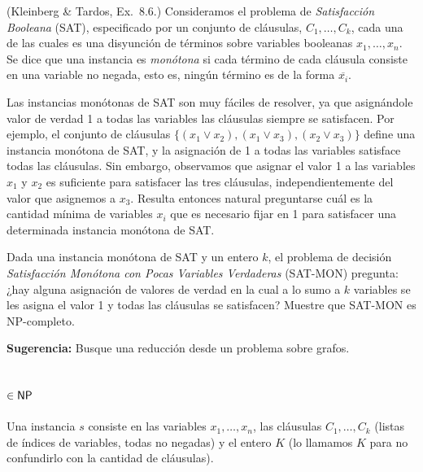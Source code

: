 \begin{enunciado}
(Kleinberg \& Tardos, Ex.~8.6.) Consideramos el problema de \emph{Satisfacción Booleana} (SAT),
especificado por un conjunto de cláusulas, $C_1,\dots,C_k$, cada una de las cuales es una disyunción de
términos sobre variables booleanas $x_1,\dots,x_n$. Se dice que una instancia es \emph{monótona} si cada
término de cada cláusula consiste en una variable no negada, esto es, ningún término es de la forma
$\overline{x_i}$.

Las instancias monótonas de SAT son muy fáciles de resolver, ya que asignándole valor de verdad 1 a todas
las variables las cláusulas siempre se satisfacen. Por ejemplo, el conjunto de cláusulas
$\{(x_1\vee x_2),(x_1\vee x_3),(x_2\vee x_3)\}$ define una instancia monótona de SAT, y la asignación de 1 a
todas las variables satisface todas las cláusulas. Sin embargo, observamos que asignar el valor 1 a las
variables $x_1$ y $x_2$ es suficiente para satisfacer las tres cláusulas, independientemente del valor que
asignemos a $x_3$. Resulta entonces natural preguntarse cuál es la cantidad mínima de variables $x_i$ que es
necesario fijar en 1 para satisfacer una determinada instancia monótona de SAT.

Dada una instancia monótona de SAT y un entero $k$, el problema de decisión \emph{Satisfacción Monótona
con Pocas Variables Verdaderas} (SAT-MON) pregunta: ¿hay alguna asignación de valores de verdad en la cual a
lo sumo a $k$ variables se les asigna el valor 1 y todas las cláusulas se satisfacen? Muestre que SAT-MON es
NP-completo.

\textbf{Sugerencia:} Busque una reducción desde un problema sobre grafos.
\end{enunciado}


\subsection*{\SATMON{} $\in\mathsf{NP}$}

Una instancia $s$ consiste en las variables $x_1,\dots,x_n$, las cláusulas $C_1,\dots,C_k$ (listas de índices
de variables, todas no negadas) y el entero $K$ (lo llamamos $K$ para no confundirlo con la cantidad de
cláusulas).

